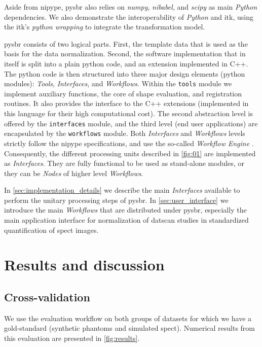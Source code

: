 \documentclass{frontiers}
\begin{document}
Aside from \gls*{nipype}, \Gls*{pysbr} also relies on \emph{numpy},
  \emph{nibabel}, and \emph{scipy} as main \emph{Python} dependencies.
We also demonstrate the interoperability of \emph{Python} and \gls*{itk},
  using the \gls*{itk}'s \emph{python wrapping} to integrate the
  transformation model. %

\Gls*{pysbr} consists of two logical parts.
First, the template data that is used as the basis for the data normalization.
Second, the software implementation that in itself is split into a plain
  python code, and an extension implemented in C++.
The python code is then structured into three major design elements (python modules):
  \emph{Tools}, \emph{Interfaces}, and \emph{Workflows}.
Within the \texttt{tools} module we implement auxiliary functions,
    the core of shape evaluation, and registration routines.
It also provides the interface to the C++ extensions
    (implemented in this language for their high computational cost).
The second abstraction level is offered by the \texttt{interfaces} module, and
  the third level (end user applications) are encapsulated by the \texttt{workflows} module.
Both \emph{Interfaces} and \emph{Workflows} levels strictly follow the
  \gls*{nipype} specifications, and use the so-called \emph{Workflow Engine}
  \citep{gorgolewski_nipype:_2011}.
Consequently, the different processing units described in \autoref{fig:01} 
  are implemented as \emph{Interfaces}. 
They are fully functional to be used as stand-alone modules, or 
  they can be \emph{Nodes} of higher level \emph{Workflows}.
  
In \autoref{sec:implementation_details} we describe the main \emph{Interfaces}
  available to perform the unitary processing steps of \gls*{pysbr}.
In \autoref{sec:user_interface} we introduce the main \emph{Workflows} that are
  distributed under \gls*{pysbr}, especially the main application interface
  for normalization of \gls*{datscan} studies in standardized
  quantification of \gls*{spect} images.

\section{Results and discussion}
\label{sec:results}

\subsection{Cross-validation}
\label{sec:results_test}
We use the evaluation workflow on both groups of datasets
  for which we have a gold-standard (synthetic phantoms and simulated \gls*{spect}).
Numerical results from this evaluation are presented in \autoref{fig:results}.
\end{document}
